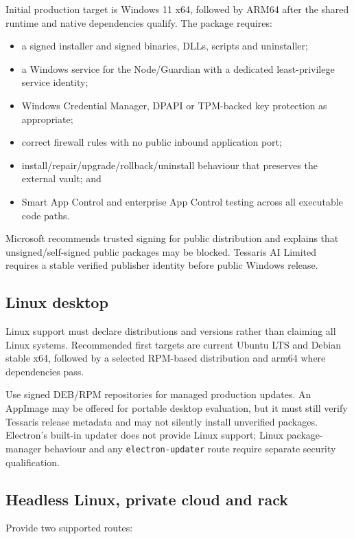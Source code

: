 \documentclass[11pt]{article}
\newcommand{\code}[1]{\texttt{#1}}
\begin{document}
Initial production target is Windows 11 x64, followed by ARM64 after the shared runtime and native dependencies qualify. The package requires:

\begin{itemize}
  \item a signed installer and signed binaries, DLLs, scripts and uninstaller;
  \item a Windows service for the Node/Guardian with a dedicated least-privilege service identity;
  \item Windows Credential Manager, DPAPI or TPM-backed key protection as appropriate;
  \item correct firewall rules with no public inbound application port;
  \item install/repair/upgrade/rollback/uninstall behaviour that preserves the external vault; and
  \item Smart App Control and enterprise App Control testing across all executable code paths.
\end{itemize}

Microsoft recommends trusted signing for public distribution and explains that unsigned/self-signed public packages may be blocked. Tessaris AI Limited requires a stable verified publisher identity before public Windows release.

\subsection{Linux desktop}

Linux support must declare distributions and versions rather than claiming all Linux systems. Recommended first targets are current Ubuntu LTS and Debian stable x64, followed by a selected RPM-based distribution and arm64 where dependencies pass.

Use signed DEB/RPM repositories for managed production updates. An AppImage may be offered for portable desktop evaluation, but it must still verify Tessaris release metadata and may not silently install unverified packages. Electron's built-in updater does not provide Linux support; Linux package-manager behaviour and any \code{electron-updater} route require separate security qualification.

\subsection{Headless Linux, private cloud and rack}

Provide two supported routes:
\end{document}

